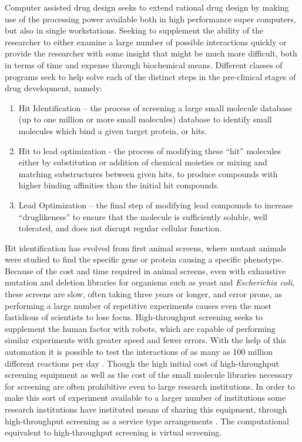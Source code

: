Computer assisted drug design seeks to extend rational drug design by making use of the processing power available both in high performance super computers, but also in single workstations.
Seeking to supplement the ability of the researcher to either examine a large number of possible interactions quickly or provide the researcher with some insight that might be much more difficult, both in terms of time and expense through biochemical means.
Different classes of programs seek to help solve each of the distinct steps in the pre-clinical stages of drug development, namely:
\begin{enumerate}
\item Hit Identification – the process of screening a large small molecule database (up to one million or more small molecules) database to identify small molecules which bind a given target protein, or hits.
\item Hit to lead optimization - the process of modifying these ``hit'' molecules either by substitution or addition of chemical moieties or mixing and matching substructures between given hits, to produce compounds with higher binding affinities than the initial hit compounds.
\item Lead Optimization – the final step of modifying lead compounds to increase ``druglikeness'' to ensure that the molecule is sufficiently soluble, well tolerated, and does not disrupt regular cellular function.
\end{enumerate}

Hit identification has evolved from first animal screens, where mutant animals were studied to find the specific gene or protein causing a specific phenotype.
Because of the cost and time required in animal screens, even with exhaustive mutation and deletion libraries for organisms such as yeast and {\it Escherichia coli}, these screens are slow, often taking three years or longer, and error prone, as performing a large number of repetitive experiments causes even the most fastidious of scientists to lose focus.
High-throughput screening seeks to supplement the human factor with robots, which are capable of performing similar experiments with greater speed and fewer errors.
With the help of this automation it is possible to test the interactions of as many as 100 million different reactions per day \cite{agresti2010ultrahigh}.
Though the high initial cost of high-throughput screening equipment as well as the cost of the small molecule libraries necessary for screening are often prohibitive even to large research institutions.
In order to make this sort of experiment available to a larger number of institutions some research institutions have instituted means of sharing this equipment, through high-throughput screening as a service type arrangements \cite{htsrc,mssr}.
The computational equivalent to high-throughput screening is virtual screening.

